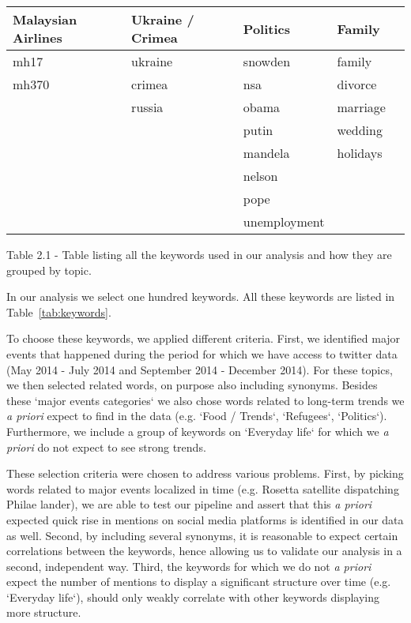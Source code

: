 \documentclass[12pt, a4paper]{article}
\begin{document}
\begin{center}
\begin{adjustbox}{max width=\textwidth}
\begin{tabular}{ | l | l | l | l | l | }
    Malaysian Airlines & Ukraine / Crimea & Politics & Family & \\ \hline
    mh17 & ukraine & snowden & family & \\
    mh370 & crimea & nsa & divorce & \\
     & russia & obama & marriage & \\
     &  & putin & wedding & \\
     &  & mandela & holidays & \\
     &  & nelson &  & \\
     &  & pope &  & \\
     &  & unemployment &  & \\
    \hline
    \end{tabular}
  \end{adjustbox}
  \caption{Table 2.1 - Table listing all the keywords used in our analysis and how they are grouped by topic.}
\end{center}

In our analysis we select one hundred keywords. All these keywords are listed in Table~\ref{tab:keywords}.

To choose these keywords, we applied different criteria. First, we identified major events that happened during the period for which we have access to twitter data (May 2014 - July 2014 and September 2014 - December 2014). For these topics, we then selected related words, on purpose also including synonyms. Besides these `major events categories` we also chose words related to long-term trends we {\it a priori} expect to find in the data (e.g. `Food / Trends`, `Refugees`, `Politics`). Furthermore, we include a group of keywords on `Everyday life` for which we {\it a priori} do not expect to see strong trends.

These selection criteria were chosen to address various problems. First, by picking words related to major events localized in time (e.g. Rosetta satellite \cite{rosetta} dispatching Philae lander), we are able to test our pipeline and assert that this {\it a priori} expected quick rise in mentions on social media platforms is identified in our data as well. Second, by including several synonyms, it is reasonable to expect certain correlations between the keywords, hence allowing us to validate our analysis in a second, independent way. Third, the keywords for which we do not {\it a priori} expect the number of mentions to display a significant structure over time (e.g. `Everyday life`), should only weakly correlate with other keywords displaying more structure.
\end{document}
